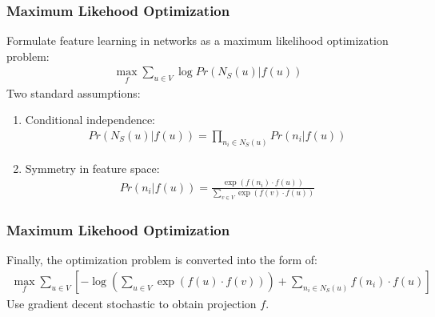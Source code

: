 \documentclass[10pt, aspectratio=169]{beamer}
\begin{document}
\begin{frame}
    \frametitle{Maximum Likehood Optimization}
    Formulate feature learning in networks as a maximum likelihood optimization problem:
    \begin{align*}
        \max_{f} \sum_{u\in V} \log Pr\left( N_S\left( u \right)|f(u)  \right) 
    \end{align*}
    Two standard assumptions:
    \begin{enumerate}
        \item Conditional independence:
            \begin{align*}
                Pr\left( N_S\left( u \right)| f\left( u \right)  \right) = \prod_{n_i\in N_S\left( u \right) }Pr\left( n_i|f(u) \right) 
            \end{align*}
        \item Symmetry in feature space:
            \begin{align*}
                Pr\left( n_i|f\left( u \right)  \right) = \frac{\exp\left( f\left( n_i \right) \cdot f\left( u \right)  \right) }{\sum_{v\in V}\exp\left( f\left( v \right)\cdot f\left( u \right)   \right)} 
            \end{align*}
    \end{enumerate}
\end{frame}

\begin{frame}
    \frametitle{Maximum Likehood Optimization}
    Finally, the optimization problem is converted into the form of:
    \begin{align*}
        \max_f \sum_{u\in V} \left[ -\log\left( \sum_{u\in V}\exp\left( f(u)\cdot f(v) \right)  \right) + \sum_{n_i\in N_S(u)} f(n_i)\cdot f(u) \right] 
    \end{align*}
    Use gradient decent stochastic to obtain projection $f$.
\end{frame}
\end{document}
